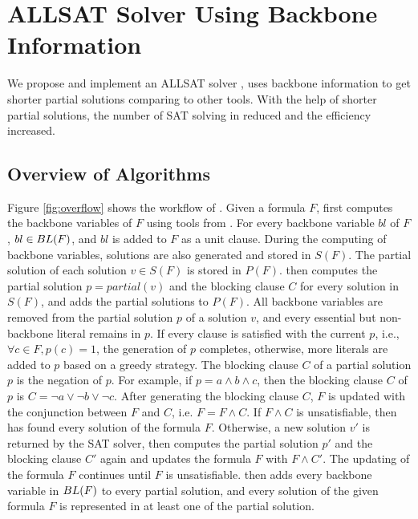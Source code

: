 \section{ALLSAT Solver Using Backbone Information} \label{sec:meth}
We propose and implement an ALLSAT solver \tool, \tool uses backbone information to get shorter partial solutions comparing to other tools.
With the help of shorter partial solutions, the number of SAT solving in \tool reduced and the efficiency increased.

\subsection{Overview of Algorithms}
Figure \ref{fig:overflow} shows the workflow of \tool.
Given a formula $F$, \tool first computes the backbone variables of $F$ using tools from \cite{bb}.
For every backbone variable $bl$ of $F$, $bl\in {\sc BL}(F)$, and $bl$ is added to $F$ as a unit clause. During the computing of backbone variables, solutions are also generated and stored in $S(F)$. The partial solution of each solution $v\in S(F)$ is stored in $P(F)$.
\tool then computes the partial solution $p=partial(v)$ and the blocking clause $C$ for every solution in $S(F)$, and adds the partial solutions to $P(F)$. 
All backbone variables are removed from the partial solution $p$ of a solution $v$, and every essential but non-backbone literal remains in $p$. If every clause is satisfied with the current $p$, i.e., $\forall c\in F, p(c)=1$, the generation of $p$ completes, otherwise, more literals are added to $p$ based on a greedy strategy.
The blocking clause $C$ of a partial solution $p$ is the negation of $p$. For example, if $p=a\wedge b \wedge c$, then the blocking clause $C$ of $p$ is $C=\neg a \vee \neg b \vee \neg c$.
After generating the blocking clause $C$, $F$ is updated with the conjunction between $F$ and $C$, i.e. $F=F\wedge C$.
If $F\wedge C$ is unsatisfiable, then \tool has found every solution of the formula $F$.
Otherwise, a new solution $v'$ is returned by the SAT solver, \tool then computes the partial solution $p'$ and the blocking clause $C'$ again and updates the formula $F$ with $F\wedge C'$.
The updating of the formula $F$ continues until $F$ is unsatisfiable.
\tool then adds every backbone variable in ${\sc BL}(F)$ to every partial solution, and every solution of the given formula $F$ is represented in at least one of the partial solution.


